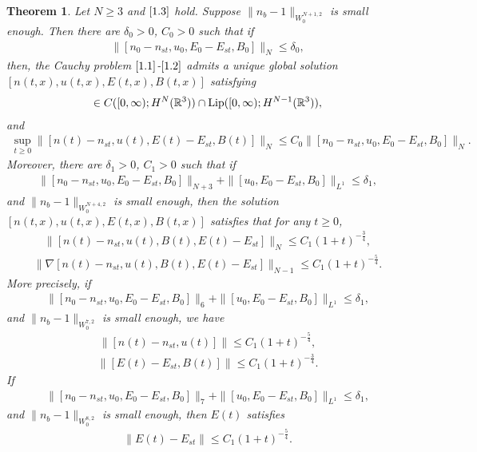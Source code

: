 \documentclass[11pt]{amsart}
\newtheorem{theorem}{Theorem}[section]
\numberwithin{equation}{section}
\begin{document}
\begin{theorem}\label{Corolary}
Let $ N\geq 3$ and $ \eqref{1.3}$ hold. Suppose
$\|n_{b}-1\|_{W_{0}^{N+1,2}}$ is small enough. Then there are $
\delta_{0}>0$, $ C_{0}>0$ such that if
\begin{eqnarray*}
\|[n_{0}-n_{st},u_{0},E_{0}-E_{st},B_{0}]\|_{N} \leq \delta_{0},
\end{eqnarray*}
then, the Cauchy problem $\eqref{1.1}$-$\eqref{1.2}$ admits a unique
global solution  $[n(t,x),u(t,x),E(t,x),B(t,x)] $ satisfying
\begin{eqnarray*}
[n-n_{st},u,E-E_{st},B]\in C([0,\infty);H^{N}(\mathbb{R}^{3}))\cap
{\rm Lip}([0,\infty);H^{N-1}(\mathbb{R}^{3})),
\end{eqnarray*}
and
\begin{eqnarray*}
\sup_{t \geq 0}\|[n(t)-n_{st},u(t),E(t)-E_{st},B(t)]\|_{N}\leq C_{0}
\|[n_{0}-n_{st},u_{0},E_{0}-E_{st},B_{0}]\|_{N}.
\end{eqnarray*}
Moreover, there are $\delta_{1}>0$, $ C_{1}>0$ such that if
\begin{eqnarray*}
\|[n_{0}-n_{st},u_{0},E_{0}-E_{st},B_{0}]\|_{N+3}+\|[u_{0},E_{0}-E_{st},B_{0}]\|_{L^{1}}\leq
\delta_{1},
\end{eqnarray*}
and $\|n_{b}-1\|_{W_{0}^{N+4,2}}$ is small enough, then the solution
$[n(t,x),u(t,x),E(t,x),B(t,x)] $ satisfies that for any  $ t \geq
0$,
\begin{eqnarray}\label{UN.decay}
\|[n(t)-n_{st},u(t),B(t),E(t)-E_{st}]\|_{N} \leq C_{1}
(1+t)^{-\frac{3}{4}},
\end{eqnarray}
\begin{eqnarray}\label{UhN.decay}
\|\nabla[n(t)-n_{st},u(t),B(t),E(t)-E_{st}]\|_{N-1} \leq C_{1}
(1+t)^{-\frac{5}{4}}.
\end{eqnarray}
More precisely, if
\begin{eqnarray*}
\|[n_{0}-n_{st},u_{0},E_{0}-E_{st},B_{0}]\|_{6}+\|[u_{0},E_{0}-E_{st},B_{0}]\|_{L^{1}}\leq
\delta_{1},
\end{eqnarray*}
and $\|n_{b}-1\|_{W_{0}^{7,2}}$ is small enough, we have
\begin{eqnarray}\label{sigmau.decay}
\|[n(t)-n_{st},u(t)]\| \leq C_{1} (1+t)^{-\frac{5}{4}},
\end{eqnarray}
\begin{eqnarray}\label{EB.decay}
\|[E(t)-E_{st},B(t)]\|\leq C_{1}(1+t)^{-\frac{3}{4}}.
\end{eqnarray}
If
\begin{eqnarray*}
\|[n_{0}-n_{st},u_{0},E_{0}-E_{st},B_{0}]\|_{7}+\|[u_{0},E_{0}-E_{st},B_{0}]\|_{L^{1}}\leq
\delta_{1},
\end{eqnarray*}
and $\|n_{b}-1\|_{W_{0}^{8,2}}$ is small enough, then $E(t)$
satisfies
\begin{eqnarray}\label{E.decay}
\|E(t)-E_{st}\|\leq C_{1}(1+t)^{-\frac{5}{4}}.
\end{eqnarray}
\end{theorem}
\end{document}
